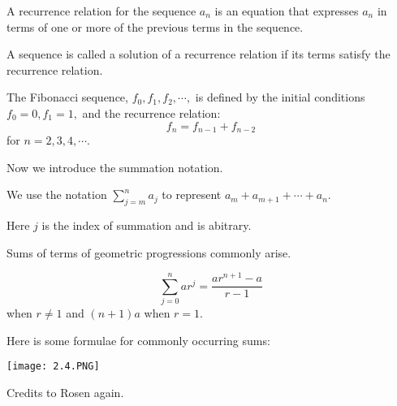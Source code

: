 \documentclass[../discrete.tex]{subfiles}
\begin{document}
A recurrence relation for the sequence ${a_n}$ is an equation that expresses $a_n$ in 
terms of one or more of the previous terms in the sequence.

A sequence is called a solution of a recurrence relation if its terms satisfy the recurrence relation.

\begin{definition}
    The Fibonacci sequence, $f_0,f_1,f_2,\cdots,$ is defined by the initial conditions 
    $f_0=0, f_1=1,$ and the recurrence relation:
    \[f_n=f_{n-1}+f_{n-2}\]
    for $n=2,3,4,\cdots$.
\end{definition}

Now we introduce the summation notation.

We use the notation $\sum^n_{j=m}a_j$ to represent $a_m+a_{m+1}+\cdots+a_n$.

Here $j$ is the index of summation and is abitrary. 

Sums of terms of geometric progressions commonly arise.

\[\sum^n_{j=0}ar^j=\frac{ar^{n+1}-a}{r-1}\]
when $r\neq 1$ and $(n+1)a$ when $r=1$. 

Here is some formulae for commonly occurring sums:
\begin{center}
    \texttt{[image: 2.4.PNG]}
\end{center}
Credits to Rosen again.
\end{document}
